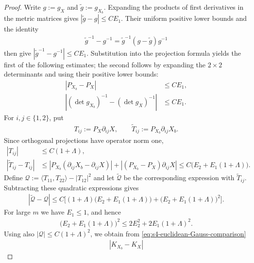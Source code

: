 \documentclass[a4paper,11pt,oneside,reqno]{amsart}
\numberwithin{equation}{section}
\theoremstyle{definition}
\begin{document}
\begin{proof}
    Write $g:=g_X$ and $\widetilde g:=g_{X_b}$.
    Expanding the products of first derivatives in the
    metric matrices gives
    $|\widetilde g-g|\leq CE_1$. Their uniform positive
    lower bounds and the identity
    \begin{align*}
        \widetilde g^{-1}-g^{-1}
        =\widetilde g^{-1}(g-\widetilde g)g^{-1}
    \end{align*}
    then give $|\widetilde g^{-1}-g^{-1}|\leq CE_1$.
    Substitution into the projection formula yields the
    first of the following estimates; the second follows
    by expanding the $2\times2$ determinants and using
    their positive lower bounds:
    \begin{align*}
        |P_{X_b}-P_X|&\leq CE_1,\\
        |(\det g_{X_b})^{-1}-(\det g_X)^{-1}|
        &\leq CE_1.
    \end{align*}
    For $i,j\in\{1,2\}$, put
    \begin{align*}
        T_{ij}:=P_X\partial_{ij}X,\qquad
        \widetilde T_{ij}:=P_{X_b}\partial_{ij}X_b.
    \end{align*}
    Since orthogonal projections have operator norm one,
    \begin{align*}
        |T_{ij}|&\leq C(1+\Lambda),\\
        |\widetilde T_{ij}-T_{ij}|
        &\leq|P_{X_b}(\partial_{ij}X_b-\partial_{ij}X)|
               +|(P_{X_b}-P_X)\partial_{ij}X|\leq C\bigl(E_2+E_1(1+\Lambda)\bigr).
    \end{align*}
    Define
    $\mathcal Q:=\langle T_{11},T_{22}\rangle-|T_{12}|^2$
    and let $\widetilde{\mathcal Q}$ be the corresponding
    expression with $\widetilde T_{ij}$. Subtracting these
    quadratic expressions gives
    \begin{align*}
        |\widetilde{\mathcal Q}-\mathcal Q|
        \leq C\bigl[(1+\Lambda)
                       \bigl(E_2+E_1(1+\Lambda)\bigr)+\bigl(E_2+E_1(1+\Lambda)\bigr)^2\bigr].
    \end{align*}
    For large $m$ we have $E_1\leq1$, and hence
    \begin{align*}
        \bigl(E_2+E_1(1+\Lambda)\bigr)^2
        \leq2E_2^2+2E_1(1+\Lambda)^2.
    \end{align*}
    Using also $|\mathcal Q|\leq C(1+\Lambda)^2$,
    we obtain from \eqref{eq:s4-euclidean-Gauss-comparison}
    \begin{align*}
        |K_{X_b}-K_X|

\end{align*}
\end{proof}
\end{document}
